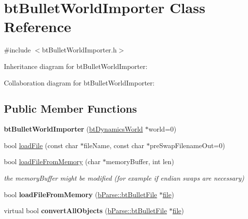 \hypertarget{classbt_bullet_world_importer}{\section{bt\+Bullet\+World\+Importer Class Reference}
\label{classbt_bullet_world_importer}
}


{\ttfamily \#include $<$bt\+Bullet\+World\+Importer.\+h$>$}



Inheritance diagram for bt\+Bullet\+World\+Importer\+:


Collaboration diagram for bt\+Bullet\+World\+Importer\+:
\subsection*{Public Member Functions}
\begin{DoxyCompactItemize}
\item 
\hypertarget{classbt_bullet_world_importer_a4b12d4e0da1ea9b9acca2f208fcee859}{{\bfseries bt\+Bullet\+World\+Importer} (\hyperlink{classbt_dynamics_world}{bt\+Dynamics\+World} $\ast$world=0)}\label{classbt_bullet_world_importer_a4b12d4e0da1ea9b9acca2f208fcee859}

\item 
bool \hyperlink{classbt_bullet_world_importer_a6ba29e6ea35cb272b2d565addcc939ad}{load\+File} (const char $\ast$file\+Name, const char $\ast$pre\+Swap\+Filename\+Out=0)
\item 
\hypertarget{classbt_bullet_world_importer_a25dadf40047465431f5eefbebd074f6b}{bool \hyperlink{classbt_bullet_world_importer_a25dadf40047465431f5eefbebd074f6b}{load\+File\+From\+Memory} (char $\ast$memory\+Buffer, int len)}\label{classbt_bullet_world_importer_a25dadf40047465431f5eefbebd074f6b}

\begin{DoxyCompactList}\small\item\em the memory\+Buffer might be modified (for example if endian swaps are necessary) \end{DoxyCompactList}\item 
\hypertarget{classbt_bullet_world_importer_a641fd67ece4767e6604650b44d535673}{bool {\bfseries load\+File\+From\+Memory} (\hyperlink{classb_parse_1_1bt_bullet_file}{b\+Parse\+::bt\+Bullet\+File} $\ast$\hyperlink{structfile}{file})}\label{classbt_bullet_world_importer_a641fd67ece4767e6604650b44d535673}

\item 
\hypertarget{classbt_bullet_world_importer_aa4cbf155312e82d076b9d5b17e6b78a6}{virtual bool {\bfseries convert\+All\+Objects} (\hyperlink{classb_parse_1_1bt_bullet_file}{b\+Parse\+::bt\+Bullet\+File} $\ast$\hyperlink{structfile}{file})}\label{classbt_bullet_world_importer_aa4cbf155312e82d076b9d5b17e6b78a6}

\end{DoxyCompactItemize}
